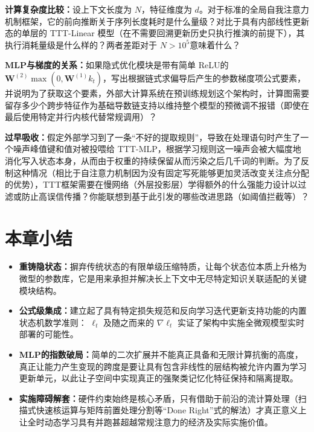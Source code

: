 \begin{exercise}
\textbf{计算复杂度比较：}设上下文长度为 $N$，特征维度为 $d$。对于标准的全局自我注意力机制框架，它的前向推断关于序列长度耗时是什么量级？对比于具有内部线性更新态的单层的 TTT-Linear 模型（在不需要回溯更新历史只执行推演的前提下），其执行消耗量级是什么样的？两者差距对于 $N > 10^5$意味着什么？
\end{exercise}

\begin{exercise}
\textbf{MLP与梯度的关系：}如果隐式优化模块是带有简单 ReLU的 $\mathbf{W}^{(2)}\max(0, \mathbf{W}^{(1)} k_t)$，写出根据链式求偏导后产生的参数梯度项公式要素，并说明为了获取这个要素，外部大计算系统在预训练规划这个架构时，计算图需要留存多少个跨步特征作为基础导数链支持以维持整个模型的预微调不报错（即使在最后使用特定并行内核代替常规调用）？
\end{exercise}

\begin{exercise}
\textbf{过早吸收：}假定外部学习到了一条“不好的提取规则”，导致在处理语句时产生了一个噪声峰值键和值对被投喂给 TTT-MLP，根据学习规则这一噪声会被大幅度地消化写入状态本身，从而由于权重的持续保留从而污染之后几千词的判断。为了反制这种情况（相比于自注意力机制因为没有固定写死能够更加灵活改变关注点分配的优势），TTT框架需要在慢网络（外层投影层）学得额外的什么强能力设计以过滤或防止高误信传播？你能联想到基于此引发的哪些改进思路（如阈值拦截等）？
\end{exercise}

\section{本章小结}
\label{sec:ttt_layers_summary}

\begin{itemize}
    \item \textbf{重铸隐状态：}摒弃传统状态的有限单级压缩特质，让每个状态位本质上升格为微型的参数库，它是用来承担并解决长上下文中无尽特定知识关联适配的关键模块结构。
    \item \textbf{公式级集成：}建立起了具有特定损失规范和反向学习迭代更新支持功能的内置状态机数学准则： $\ell_t$ 及随之而来的 $\nabla \ell_t$ 实证了架构中实施全微观模型实时部署的可能性。
    \item \textbf{MLP的指数破局：}简单的二次扩展并不能真正具备和无限计算抗衡的高度，真正让能力产生变现的跨度是要让具有包含非线性的层结构被允许内置为学习更新单元，以此让子空间中实现真正的强聚类记忆化特征保持和隔离提取。
    \item \textbf{实施障碍解套：}硬件约束始终是核心矛盾，只有借助于前沿的流计算处理（扫描式快速核运算与矩阵前置处理分割等“Done Right”式的解法）才真正意义上让全时动态学习具有并跑甚超越常规注意力的经济及实际实施价值。
\end{itemize}

